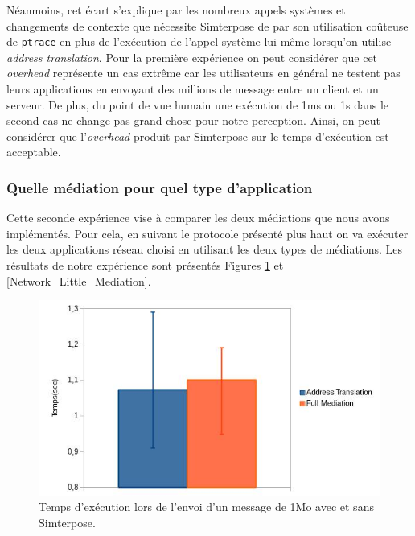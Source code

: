 Néanmoins, cet écart s'explique par les nombreux appels systèmes et changements de contexte que nécessite Simterpose de par son utilisation coûteuse de \texttt{ptrace} en plus de l'exécution de l'appel système lui-même lorsqu'on utilise \textit{address translation}. Pour la première expérience on peut considérer que cet \textit{overhead} représente un cas extrême car les utilisateurs en général ne testent pas leurs applications en envoyant des millions de message entre un client et un serveur. De plus, du point de vue humain une exécution de 1ms ou 1s dans le second cas ne change pas grand chose pour notre perception. Ainsi, on peut considérer que l'\textit{overhead} produit par Simterpose sur le temps d'exécution est acceptable.

\subsubsection{Quelle médiation pour quel type d'application}
 Cette seconde expérience vise à comparer les deux médiations que nous avons implémentés. Pour cela, en suivant le protocole présenté plus haut on va exécuter les deux applications réseau choisi en utilisant les deux types de médiations. Les résultats de notre expérience sont présentés Figures \ref{Network_Big_Mediation} et \ref{Network_Little_Mediation}.

 \begin{figure}[H]
  \centering
    \includegraphics[scale=0.5]{mesures/graph/Bigmsg.jpg}
    \caption[Temps d'exécution lors de l'envoi d'un message de 1Mo]{Temps d'exécution lors de l'envoi d'un message de 1Mo avec et sans Simterpose.}
    \label{Network_Big_Mediation}
\end{figure}

